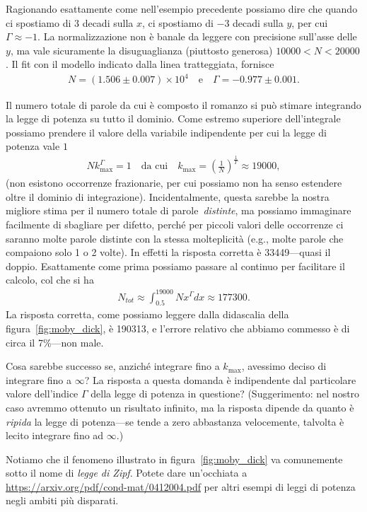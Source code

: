 \begin{solution}

\begin{center}
    
\end{center}

Ragionando esattamente come nell'esempio precedente possiamo dire che
quando ci spostiamo di $3$ decadi sulla $x$, ci spostiamo di $-3$ decadi sulla
$y$, per cui $\Gamma \approx -1$. La normalizzazione non è banale da leggere
con precisione sull'asse delle $y$, ma vale sicuramente la disuguaglianza
(piuttosto generosa) $10000 < N < 20000$. Il fit con il modello indicato dalla
linea tratteggiata, fornisce
\begin{align*}
  N = (1.506 \pm 0.007) \times 10^4 \quad \text{e} \quad \Gamma = -0.977 \pm 0.001.
\end{align*}

Il numero totale di parole da cui è composto il romanzo si può stimare
integrando la legge di potenza su tutto il dominio. Come estremo superiore
dell'integrale possiamo prendere il valore della variabile indipendente per cui
la legge di potenza vale $1$
\begin{align*}
  N k_{\text{max}}^\Gamma = 1 \quad \text{da cui} \quad k_{\text{max}} =
  \left(\frac{1}{N}\right)^{\frac{1}{\Gamma}} \approx 19000,
\end{align*}
(non esistono occorrenze frazionarie, per cui possiamo non ha senso estendere
oltre il dominio di integrazione). Incidentalmente, questa sarebbe la nostra
migliore stima per il numero totale di parole~\emph{distinte}, ma possiamo
immaginare facilmente di sbagliare per difetto, perché per piccoli valori delle
occorrenze ci saranno molte parole distinte con la stessa molteplicità (e.g.,
molte parole che compaiono solo 1 o 2 volte). In effetti la risposta corretta
è 33449---quasi il doppio.
Esattamente come prima possiamo passare al continuo per facilitare il calcolo,
col che si ha
\begin{align*}
  N_{tot} \approx \int_{0.5}^{19000} N x^\Gamma dx \approx 177300.
\end{align*}
La risposta corretta, come possiamo leggere dalla didascalia della
figura~\ref{fig:moby_dick}, è 190313, e l'errore relativo che abbiamo commesso
è di circa il 7\%---non male.

Cosa sarebbe successo se, anziché integrare fino a $k_{\text{max}}$, avessimo
deciso di integrare fino a $\infty$? La risposta a questa domanda è
indipendente dal particolare valore dell'indice $\Gamma$ della legge di
potenza in questione? (Suggerimento: nel nostro caso avremmo ottenuto un
risultato infinito, ma la risposta dipende da quanto è \emph{ripida} la legge
di potenza---se tende a zero abbastanza velocemente, talvolta è lecito
integrare fino ad $\infty$.)

Notiamo che il fenomeno illustrato in figura~\ref{fig:moby_dick} va comunemente
sotto il nome di \emph{legge di Zipf}. Potete dare un'occhiata a
\url{https://arxiv.org/pdf/cond-mat/0412004.pdf} per altri esempi di leggi di
potenza negli ambiti più disparati.

\end{solution}




